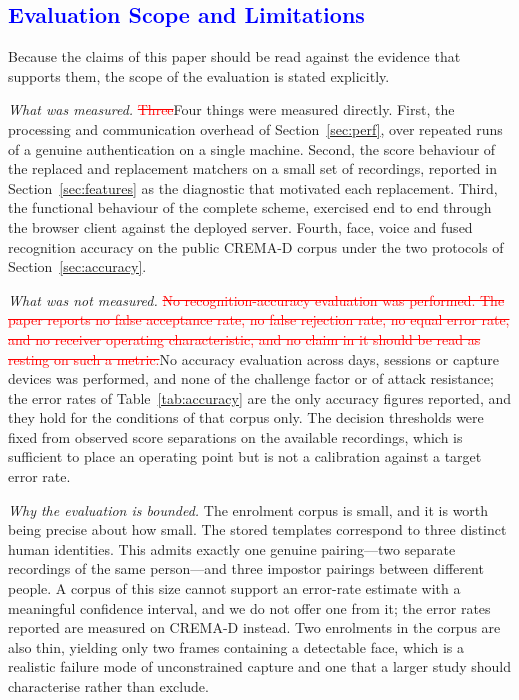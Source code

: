 \documentclass[10pt,journal,compsoc]{IEEEtran}
\begin{document}
{\color{blue}
\subsection{\textcolor{blue}{Evaluation Scope and Limitations}}\label{sec:limits}
Because the claims of this paper should be read against the evidence that supports them, the scope of the evaluation is stated explicitly.

\emph{What was measured.} \textcolor{red}{\sout{Three}}\textcolor{revpink}{Four} things were measured directly. First, the processing and communication overhead of Section~\ref{sec:perf}, over repeated runs of a genuine authentication on a single machine. Second, the score behaviour of the replaced and replacement matchers on a small set of recordings, reported in Section~\ref{sec:features} as the diagnostic that motivated each replacement. Third, the functional behaviour of the complete scheme, exercised end to end through the browser client against the deployed server. \textcolor{revpink}{Fourth, face, voice and fused recognition accuracy on the public CREMA-D corpus under the two protocols of Section~\ref{sec:accuracy}.}

\emph{What was not measured.} \textcolor{red}{\sout{No recognition-accuracy evaluation was performed. The paper reports no false acceptance rate, no false rejection rate, no equal error rate, and no receiver operating characteristic, and no claim in it should be read as resting on such a metric.}}\textcolor{revpink}{No accuracy evaluation across days, sessions or capture devices was performed, and none of the challenge factor or of attack resistance; the error rates of Table~\ref{tab:accuracy} are the only accuracy figures reported, and they hold for the conditions of that corpus only.} The decision thresholds were fixed from observed score separations on the available recordings, which is sufficient to place an operating point but is not a calibration against a target error rate.

\emph{Why the evaluation is bounded.} The enrolment corpus is small, and it is worth being precise about how small. The stored templates correspond to three distinct human identities. This admits exactly one genuine pairing---two separate recordings of the same person---and three impostor pairings between different people. A corpus of this size cannot support an error-rate estimate with a meaningful confidence interval, and we do not offer one\textcolor{revpink}{ from it; the error rates reported are measured on CREMA-D instead}. Two enrolments in the corpus are also thin, yielding only two frames containing a detectable face, which is a realistic failure mode of unconstrained capture and one that a larger study should characterise rather than exclude.

}
\end{document}
